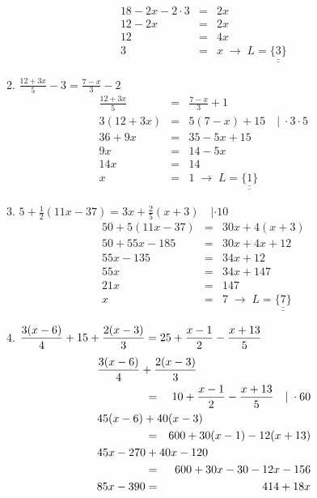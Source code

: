 \documentclass[%
11pt,%
twoside,%
titlepage,%
german,%
]{scrartcl}
\newcommand{\result}[1]{\underline{\underline{#1}}}
\begin{document}
\begin{enumerate}
\begin{enumerate}
\begin{eqnarray*}
      18-2x - 2 \cdot 3 & = & 2x \\
      12 - 2x & = & 2x \\
      12 & = & 4x \\
      3 & = & x \;\to\; L=\result{\{3\}}
    \end{eqnarray*}
  \item $\displaystyle \frac{12+3x}{5}-3 = \frac{7-x}{3}-2$
    \begin{eqnarray*}
      \frac{12+3x}{5} & = & \frac{7-x}{3} + 1 \\
      3(12+3x) & = & 5(7-x) + 15 \quad |\;\cdot 3 \cdot 5 \\
      36 + 9x & = & 35 - 5x + 15 \\
      9x & = & 14 - 5x \\
      14x & = & 14 \\
      x & = & 1 \;\to\; L=\result{\{1\}}
    \end{eqnarray*}
  \item $\displaystyle 5+\frac{1}{2}(11x-37)=3x+\frac{2}{5}(x+3) \quad | \cdot 10$
    \begin{eqnarray*}
      50 + 5(11x-37) & = & 30x + 4(x+3) \\
      50 + 55x - 185 & = & 30x + 4x + 12 \\
      55x - 135 & = & 34x + 12 \\
      55x & = & 34x + 147 \\
      21x & = & 147 \\
      x & = & 7 \;\to\; L=\result{\{7\}}
    \end{eqnarray*}
  \item $\displaystyle \frac{3(x-6)}{4}+15+\frac{2(x-3)}{3} \\[1ex] =25+\frac{x-1}{2}-\frac{x+13}{5}$
    \begin{eqnarray*}
      \lefteqn{\frac{3(x-6)}{4}+\frac{2(x-3)}{3}} \hspace{1.5cm} \\
      & = & 10+\frac{x-1}{2}-\frac{x+13}{5} \quad |\;\cdot 60 \\
      \lefteqn{45(x-6) + 40(x-3)} \hspace{1.5cm} \\ 
      & = & 600 + 30(x-1) - 12(x+13) \\
      \lefteqn{45x-270+40x-120} \hspace{1.5cm} \\
      & = & 600+30x-30-12x-156 \\
      85x-390 & = & 414 + 18x \\

\end{eqnarray*}
\end{enumerate}
\end{enumerate}
\end{document}
